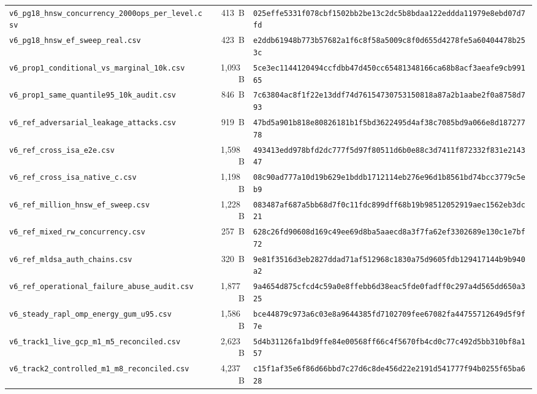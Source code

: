 \documentclass[10pt,journal,compsoc]{IEEEtran}
\begin{document}
\begin{table}[!ht]
{\begin{tabular}{@{}lrl@{}}
\texttt{v6\_pg18\_hnsw\_concurrency\_2000ops\_per\_level.csv} & 413~B & \texttt{025effe5331f078cbf1502bb2be13c2dc5b8bdaa122eddda11979e8ebd07d7fd} \\
\texttt{v6\_pg18\_hnsw\_ef\_sweep\_real.csv} & 423~B & \texttt{e2ddb61948b773b57682a1f6c8f58a5009c8f0d655d4278fe5a60404478b253c} \\
\texttt{v6\_prop1\_conditional\_vs\_marginal\_10k.csv} & 1,093~B & \texttt{5ce3ec1144120494ccfdbb47d450cc65481348166ca68b8acf3aeafe9cb99165} \\
\texttt{v6\_prop1\_same\_quantile95\_10k\_audit.csv} & 846~B & \texttt{7c63804ac8f1f22e13ddf74d76154730753150818a87a2b1aabe2f0a8758d793} \\
\texttt{v6\_ref\_adversarial\_leakage\_attacks.csv} & 919~B & \texttt{47bd5a901b818e80826181b1f5bd3622495d4af38c7085bd9a066e8d18727778} \\
\texttt{v6\_ref\_cross\_isa\_e2e.csv} & 1,598~B & \texttt{493413edd978bfd2dc777f5d97f80511d6b0e88c3d7411f872332f831e214347} \\
\texttt{v6\_ref\_cross\_isa\_native\_c.csv} & 1,198~B & \texttt{08c90ad777a10d19b629e1bddb1712114eb276e96d1b8561bd74bcc3779c5eb9} \\
\texttt{v6\_ref\_million\_hnsw\_ef\_sweep.csv} & 1,228~B & \texttt{083487af687a5bb68d7f0c11fdc899dff68b19b98512052919aec1562eb3dc21} \\
\texttt{v6\_ref\_mixed\_rw\_concurrency.csv} & 257~B & \texttt{628c26fd90608d169c49ee69d8ba5aaecd8a3f7fa62ef3302689e130c1e7bf72} \\
\texttt{v6\_ref\_mldsa\_auth\_chains.csv} & 320~B & \texttt{9e81f3516d3eb2827ddad71af512968c1830a75d9605fdb129417144b9b940a2} \\
\texttt{v6\_ref\_operational\_failure\_abuse\_audit.csv} & 1,877~B & \texttt{9a4654d875cfcd4c59a0e8ffebb6d38eac5fde0fadff0c297a4d565dd650a325} \\
\texttt{v6\_steady\_rapl\_omp\_energy\_gum\_u95.csv} & 1,586~B & \texttt{bce44879c973a6c03e8a9644385fd7102709fee67082fa44755712649d5f9f7e} \\
\texttt{v6\_track1\_live\_gcp\_m1\_m5\_reconciled.csv} & 2,623~B & \texttt{5d4b31126fa1bd9ffe84e00568ff66c4f5670fb4cd0c77c492d5bb310bf8a157} \\
\texttt{v6\_track2\_controlled\_m1\_m8\_reconciled.csv} & 4,237~B & \texttt{c15f1af35e6f86d66bbd7c27d6c8de456d22e2191d541777f94b0255f65ba628} \\
\bottomrule
\end{tabular}%
}
\end{table}
\end{document}
